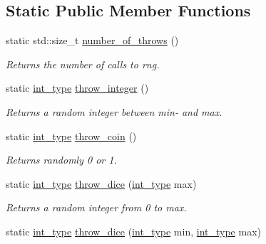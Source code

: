 \subsection*{Static Public Member Functions}
\begin{DoxyCompactItemize}
\item 
\hypertarget{a00460_aea964b4b9f7a0c33cec784099bdabad3}{static std\-::size\-\_\-t \hyperlink{a00460_aea964b4b9f7a0c33cec784099bdabad3}{number\-\_\-of\-\_\-throws} ()}\label{a00460_aea964b4b9f7a0c33cec784099bdabad3}

\begin{DoxyCompactList}\small\item\em Returns the number of calls to rng. \end{DoxyCompactList}\item 
\hypertarget{a00460_a25a21df7cddd17508448cb9fce5b324e}{static \hyperlink{a00460_aaea501ae2db60d08b10b98b3cf499f37}{int\-\_\-type} \hyperlink{a00460_a25a21df7cddd17508448cb9fce5b324e}{throw\-\_\-integer} ()}\label{a00460_a25a21df7cddd17508448cb9fce5b324e}

\begin{DoxyCompactList}\small\item\em Returns a random integer between min-\/ and max. \end{DoxyCompactList}\item 
\hypertarget{a00460_ad871ac7b41171f96c1fc9da41dddce2f}{static \hyperlink{a00460_aaea501ae2db60d08b10b98b3cf499f37}{int\-\_\-type} \hyperlink{a00460_ad871ac7b41171f96c1fc9da41dddce2f}{throw\-\_\-coin} ()}\label{a00460_ad871ac7b41171f96c1fc9da41dddce2f}

\begin{DoxyCompactList}\small\item\em Returns randomly 0 or 1. \end{DoxyCompactList}\item 
\hypertarget{a00460_ac2697129e9250c4bbba19f710a516a46}{static \hyperlink{a00460_aaea501ae2db60d08b10b98b3cf499f37}{int\-\_\-type} \hyperlink{a00460_ac2697129e9250c4bbba19f710a516a46}{throw\-\_\-dice} (\hyperlink{a00460_aaea501ae2db60d08b10b98b3cf499f37}{int\-\_\-type} max)}\label{a00460_ac2697129e9250c4bbba19f710a516a46}

\begin{DoxyCompactList}\small\item\em Returns a random integer from 0 to max. \end{DoxyCompactList}\item 
\hypertarget{a00460_a2dacb6aab559df22441ff8878a738445}{static \hyperlink{a00460_aaea501ae2db60d08b10b98b3cf499f37}{int\-\_\-type} \hyperlink{a00460_a2dacb6aab559df22441ff8878a738445}{throw\-\_\-dice} (\hyperlink{a00460_aaea501ae2db60d08b10b98b3cf499f37}{int\-\_\-type} min, \hyperlink{a00460_aaea501ae2db60d08b10b98b3cf499f37}{int\-\_\-type} max)}\label{a00460_a2dacb6aab559df22441ff8878a738445}


\end{DoxyCompactItemize}
